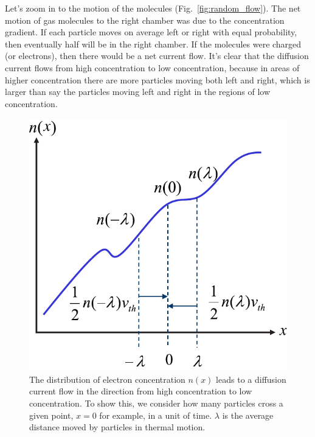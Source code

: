 Let’s zoom in to the motion of the molecules (Fig.~\ref{fig:random_flow}).  The net motion of gas molecules to the right chamber was due to the concentration gradient.
If each particle moves on average left or right with equal probability, then eventually half will be in the right chamber. If the molecules were charged (or electrons), then there would be a net current flow.  It's clear that the diffusion current flows from high concentration to low concentration, because in areas of higher concentration there are more particles moving both left and right, which is larger than say the particles moving left and right in the regions of low concentration.
\begin{figure}[tb]
\centering
\includegraphics[width=.45\columnwidth]{slide48}
\caption{The distribution of electron concentration $n(x)$ leads to a diffusion current flow in the direction from high concentration to low concentration.  To show this, we consider how many particles cross a given point, $x=0$ for example, in a unit of time.  $\lambda$ is the average distance moved by particles in thermal motion.}
\label{fig:slide48}
\end{figure}

